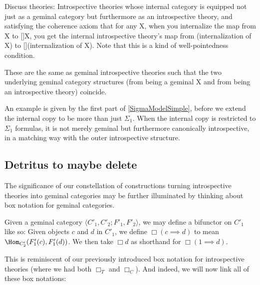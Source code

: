 \begin{TODOblock}
Discuss  theories: Introspective theories whose internal category is equipped not just as a geminal category but furthermore as an introspective theory, and satisfying the coherence axiom that for any X, when you internalize the map from X to []X, you get the internal introspective theory's map from (internalization of X) to [](internalization of X). Note that this is a kind of well-pointedness condition.

These are the same as geminal introspective theories such that the two underlying geminal category structures (from being a geminal X and from being an introspective theory) coincide.

An example is given by the first part of \cref{SigmaModelSimple}, before we extend the internal copy to be more than just $\Sigma_1$. When the internal copy is restricted to $\Sigma_1$ formulas, it is not merely geminal but furthermore canonically introspective, in a matching way with the outer introspective structure.
\end{TODOblock}



\subsection{Detritus to maybe delete}
The significance of our constellation of constructions turning introspective theories into geminal categories may be further illuminated by thinking about box notation for geminal categories.

\begin{definition}\label{BoxForGeminal}
Given a geminal category $\langle C'_1, C'_2; F'_1, F'_2 \rangle$, we may define a bifunctor on $C'_1$ like so: Given objects $c$ and $d$ in $C'_1$, we define $\Box(c \implies d)$ to mean $\Hom_{C'_2}(F'_1(c), F'_1(d))$. We then take $\Box d$ as shorthand for $\Box(1 \implies d)$.
\end{definition}

This is reminiscent of our previously introduced box notation for introspective theories (where we had both $\Box_T$ and $\Box_C$). And indeed, we will now link all of these box notations:

